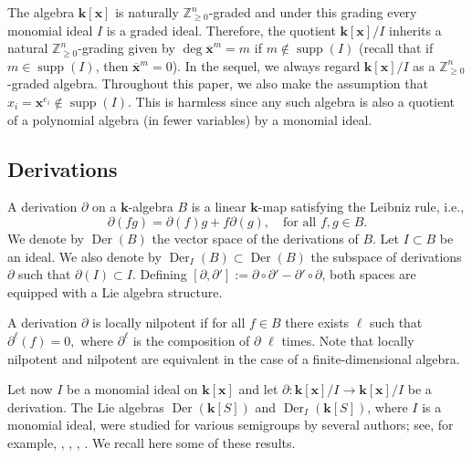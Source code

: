 \documentclass[11pt,letterpaper,reqno]{amsart}
\theoremstyle{remark}
\theoremstyle{definition}
\def\XX{\mathbf{x}}
\newcommand{\KK}[0]{\ensuremath{\mathbf{k}}}
\newcommand{\ZZ}[0]{\ensuremath{\mathbb{Z}}}
\newcommand{\supp}[0]{\ensuremath{\operatorname{supp}}}
\newcommand{\Der}[0]{\ensuremath{\operatorname{Der}}}
\newcommand{\quot}[1]{{\overline{#1}}}
\begin{document}
The algebra $\KK[\XX]$ is naturally $\ZZ^n_{\geq 0}$-graded and under this grading every monomial ideal $I$ is a graded ideal. Therefore, the quotient $\KK[\XX]/I$ inherits a natural $\ZZ^n_{\geq 0}$-grading given by $\deg \quot{\XX}^m=m$ if $m\notin \supp(I)$ (recall that if $m\in \supp(I)$, then $\quot{\XX}^m=0$). In the sequel, we always regard $\KK[\XX]/I$ as a $\ZZ^n_{\geq 0}$-graded algebra. Throughout this paper, we also make the assumption that $x_i=\XX^{e_i}\not\in\supp(I)$. This is harmless since any such algebra is also a quotient of a polynomial algebra (in fewer variables) by a monomial ideal.

\subsection{Derivations}\label{sec:derivations}
A derivation $\partial$ on a $\KK$-algebra $B$ is a linear $\KK$-map satisfying the Leibniz rule, i.e., 
$$
\partial(fg)=\partial(f)g+f\partial(g), \quad \text{for all } f,g \in B.
$$
We denote by $\Der(B)$ the vector space of the derivations of $B$. Let $I\subset B$ be an ideal. We also denote by $\Der_I(B)\subset \Der(B)$ the subspace of derivations $\partial$ such that $\partial(I)\subset I$. Defining $[\partial,\partial']:=\partial\circ\partial'-\partial'\circ\partial$, both spaces are equipped with a Lie algebra structure.

A derivation $\partial$ is locally nilpotent if for all $f\in B$ there exists $\ell$ such that $\partial^\ell(f)=0,$ where $\partial^\ell$ is the composition of $\partial$ $\ell$ times. Note that locally nilpotent and nilpotent are equivalent in the case of a finite-dimensional algebra.

Let now $I$ be a monomial ideal on $\KK[\XX]$ and let $\partial\colon\KK[\XX]/I\to\KK[\XX]/I$ be a derivation. The Lie algebras $\Der(\KK[S])$ and $\Der_I(\KK[S])$, where $I$ is a monomial ideal, were studied for various semigroups by several authors; see, for example, \cite[Theorem~2.2.1]{B95}, \cite[Theorem~2.2]{T09}, \cite[Proposition~3.1]{KLL15}, \cite[Propositions~1.3 and~1.4]{DLMR24}. We recall here some of these results.
\end{document}
